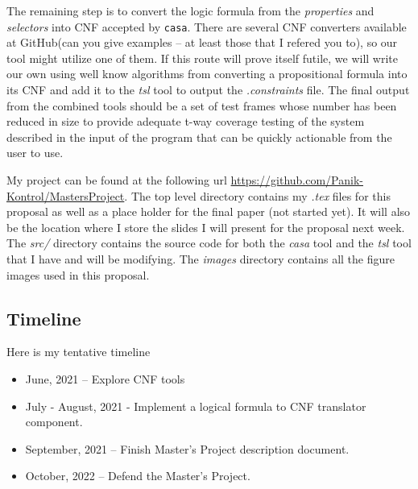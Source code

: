 \documentclass[a4full,12pt]{article}
\newcommand{\eas}[1]{{\color{blue}\sf ({#1})}}
\begin{document}
  The remaining step is to convert the logic formula from the \emph{properties} and \emph{selectors} into CNF accepted by \texttt{casa}. There are several CNF converters available at GitHub\eas{can you give examples -- at least those that I refered you to}, so our tool might utilize one of them. If
this route will prove itself futile,  we will write our own using well know algorithms from converting a propositional formula into its CNF and add it to the \emph{tsl} tool to output the \emph{.constraints} file. The final output from the combined tools should be a set of test
  frames whose number has been reduced in size to provide adequate t-way coverage testing of the system described
  in the input of the program that can be quickly actionable from the user to use.
  
My project can be found at the following url \url{https://github.com/Panik-Kontrol/MastersProject}.
  The top level directory contains my \emph{.tex} files for this proposal as well as a place
  holder for the final paper (not started yet). It will also be the location where I store the
  slides I will present for the proposal next week. The \emph{src/} directory contains the source
  code for both the \emph{casa} tool and the \emph{tsl} tool that I have and will be modifying.
  The \emph{images} directory contains all the figure images used in this proposal.
  
  \subsection{Timeline}
  Here is my tentative timeline
  \begin{itemize}
  \item June, 2021 -- Explore CNF tools
  \item July - August, 2021 - Implement a logical formula to CNF translator component.
  \item September, 2021 -- Finish Master's Project description document.
  \item October, 2022 -- Defend the Master's Project.
  \end{itemize}
\end{document}
